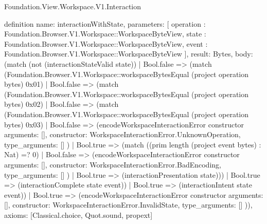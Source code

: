 \begin{lexlean}{Foundation.View.Workspace.V1.Interaction}
\begin{semanticmodule}
definition{
  name: interactionWithState,
  parameters: [
    operation : Foundation.Browser.V1.Workspace::WorkspaceByteView,
    state : Foundation.Browser.V1.Workspace::WorkspaceByteView,
    event : Foundation.Browser.V1.Workspace::WorkspaceByteView
  ],
  result: Bytes,
  body: (match (not (interactionStateValid state))
    | Bool.false => (match (Foundation.Browser.V1.Workspace::workspaceBytesEqual (project operation bytes) 0x01)
      | Bool.false => (match (Foundation.Browser.V1.Workspace::workspaceBytesEqual (project operation bytes) 0x02)
        | Bool.false => (match (Foundation.Browser.V1.Workspace::workspaceBytesEqual (project operation bytes) 0x03)
          | Bool.false => (encodeWorkspaceInteractionError constructor{
            arguments: [],
            constructor: WorkspaceInteractionError.UnknownOperation,
            type_arguments: []
          })
          | Bool.true => (match ((prim length (project event bytes) : Nat) =? 0)
            | Bool.false => (encodeWorkspaceInteractionError constructor{
              arguments: [],
              constructor: WorkspaceInteractionError.BadEncoding,
              type_arguments: []
            })
            | Bool.true => (interactionPresentation state)))
        | Bool.true => (interactionComplete state event))
      | Bool.true => (interactionIntent state event))
    | Bool.true => (encodeWorkspaceInteractionError constructor{
      arguments: [],
      constructor: WorkspaceInteractionError.InvalidState,
      type_arguments: []
    })),
  axioms: [Classical.choice, Quot.sound, propext]
}


\end{semanticmodule}
\end{lexlean}
